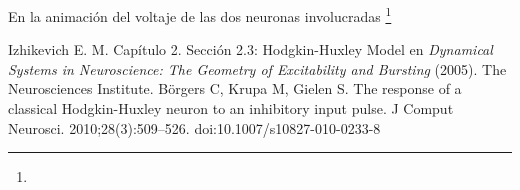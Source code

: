     En la animación del voltaje de las dos neuronas involucradas \footnote{}




\begin{thebibliography}{50}

{} Izhikevich E. M. Capítulo 2. Sección 2.3: Hodgkin-Huxley Model en {\sl Dynamical Systems in Neuroscience: The Geometry of Excitability and Bursting} (2005).  The Neurosciences Institute.
 Börgers C, Krupa M, Gielen S. The response of a classical Hodgkin-Huxley neuron to an inhibitory input pulse. J Comput Neurosci. 2010;28(3):509–526. doi:10.1007/s10827-010-0233-8

\end{thebibliography}

